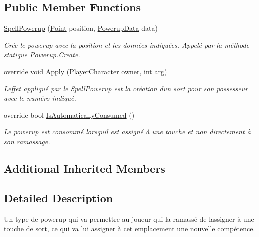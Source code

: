 \subsection*{Public Member Functions}
\begin{DoxyCompactItemize}
\item 
\hyperlink{class_tentacle_slicers_1_1actors_1_1_spell_powerup_ab43025670bf0f9234fea53c559cd1b1d}{Spell\+Powerup} (\hyperlink{class_tentacle_slicers_1_1general_1_1_point}{Point} position, \hyperlink{class_tentacle_slicers_1_1actors_1_1_powerup_data}{Powerup\+Data} data)
\begin{DoxyCompactList}\small\item\em Crée le powerup avec la position et les données indiquées. Appelé par la méthode statique \hyperlink{class_tentacle_slicers_1_1actors_1_1_powerup_a170bfc9101d384a73957470249458cfc}{Powerup.\+Create}. \end{DoxyCompactList}\item 
override void \hyperlink{class_tentacle_slicers_1_1actors_1_1_spell_powerup_ad779a4a5ca4ccb8895f40f8a5f64dad3}{Apply} (\hyperlink{class_tentacle_slicers_1_1actors_1_1_player_character}{Player\+Character} owner, int arg)
\begin{DoxyCompactList}\small\item\em L\textquotesingle{}effet appliqué par le \hyperlink{class_tentacle_slicers_1_1actors_1_1_spell_powerup}{Spell\+Powerup} est la création d\textquotesingle{}un sort pour son possesseur avec le numéro indiqué. \end{DoxyCompactList}\item 
override bool \hyperlink{class_tentacle_slicers_1_1actors_1_1_spell_powerup_a9286f05a6eee9fb10532bf7439340bd8}{Is\+Automatically\+Consumed} ()
\begin{DoxyCompactList}\small\item\em Le powerup est consommé lorsqu\textquotesingle{}il est assigné à une touche et non directement à son ramassage. \end{DoxyCompactList}\end{DoxyCompactItemize}
\subsection*{Additional Inherited Members}


\subsection{Detailed Description}
Un type de powerup qui va permettre au joueur qui l\textquotesingle{}a ramassé de l\textquotesingle{}assigner à une touche de sort, ce qui va lui assigner à cet emplacement une nouvelle compétence. 



